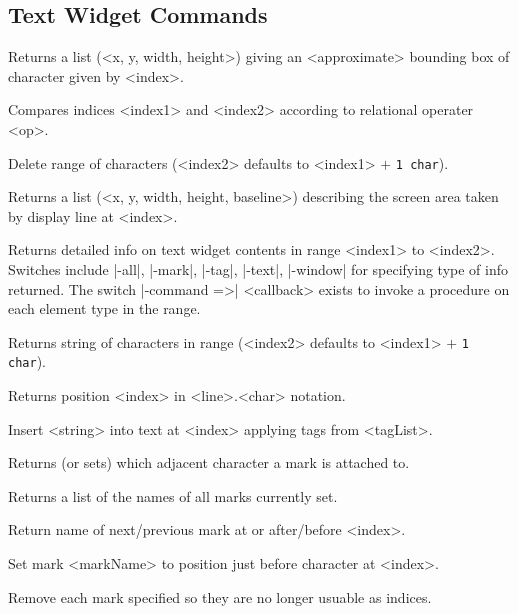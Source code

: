 \subsection*{Text Widget Commands}
\begin{enum}{1cm}

Returns a list (<x, y, width, height>)  giving an <approximate> 
bounding box of character given by <index>.

Compares indices <index1> and <index2> according to relational operater <op>.

Delete range of characters (<index2> defaults to <index1> $+$ {\tt 1 char}).

Returns a list (<x, y, width, height, baseline>) describing the screen area 
taken by display line at <index>.

Returns detailed info on text widget contents in range <index1> to <index2>.
Switches include |-all|, |-mark|, |-tag|, |-text|, |-window| for specifying
type of info returned. The switch |-command =>| <callback> exists to invoke
a procedure on each element type in the range.

Returns string of characters in range (<index2> defaults to <index1> $+$ {\tt 1 char}).

Returns position <index> in <line>.<char> notation.

Insert <string> into text at <index> applying tags from <tagList>.

Returns (or sets) which adjacent character a mark is attached to.

Returns a list of the names of all marks currently set.

Return name of next/previous mark at or after/before <index>.

Set mark <markName> to position just before character at <index>.

Remove each mark specified so they are no longer usuable as indices.


\end{enum}
